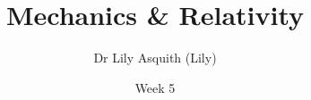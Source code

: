 


% 
\title[ Mechanics \& Relativity]{Mechanics \& Relativity}
\author[Dr Lily Asquith (Lily)]{ Dr Lily Asquith (Lily)}
\date[Week 5]{Week 5}





\begin{frame}
\titlepage
\end{frame} 


%
%
%
% 
%
%
%
%
%
